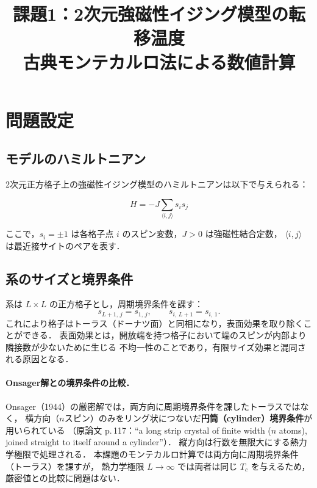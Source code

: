 \documentclass[12pt,a4paper]{ltjsarticle}
\title{\Large 課題1：2次元強磁性イジング模型の転移温度\\
\large 古典モンテカルロ法による数値計算}
\author{}
\date{}
\begin{document}
\maketitle

\tableofcontents
\newpage

\section{問題設定}

\subsection{モデルのハミルトニアン}

2次元正方格子上の強磁性イジング模型のハミルトニアンは以下で与えられる：

\begin{equation}
  H = -J \sum_{\langle i,j \rangle} s_i s_j
  \label{eq:hamiltonian}
\end{equation}

ここで，$s_i = \pm 1$ は各格子点 $i$ のスピン変数，$J > 0$ は強磁性結合定数，
$\langle i,j \rangle$ は最近接サイトのペアを表す．

\subsection{系のサイズと境界条件}

系は $L \times L$ の正方格子とし，周期境界条件を課す：
\begin{equation}
  s_{L+1,\, j} = s_{1,\, j}, \qquad s_{i,\, L+1} = s_{i,\, 1}.
\end{equation}
これにより格子はトーラス（ドーナツ面）と同相になり，表面効果を取り除くことができる．
表面効果とは，開放端を持つ格子において端のスピンが内部より隣接数が少ないために生じる
不均一性のことであり，有限サイズ効果と混同される原因となる．

\paragraph{Onsager解との境界条件の比較．}
Onsager（1944）の厳密解では，両方向に周期境界条件を課したトーラスではなく，
横方向（$n$スピン）のみをリング状につないだ\textbf{円筒（cylinder）境界条件}が用いられている
（原論文 p.\,117：``a long strip crystal of finite width ($n$ atoms), joined straight to itself around a cylinder''）．
縦方向は行数を無限大にする熱力学極限で処理される．
本課題のモンテカルロ計算では両方向に周期境界条件（トーラス）を課すが，
熱力学極限 $L\to\infty$ では両者は同じ $T_c$ を与えるため，厳密値との比較に問題はない．
\end{document}

